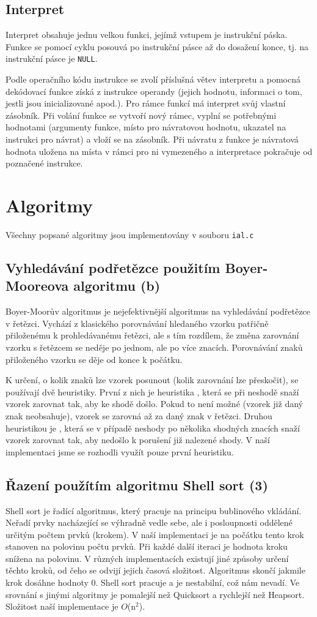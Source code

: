 \documentclass[a4paper, 11pt]{article}
\begin{document}
    \subsection{Interpret}
    Interpret obsahuje jednu velkou funkci, jejímž vstupem je instrukční páska. Funkce se pomocí cyklu posouvá po instrukční pásce až do dosažení konce, tj. na instrukční pásce je \texttt{NULL}.\par
    Podle operačního kódu instrukce se zvolí příslušná větev interpretu a pomocná dekódovací funkce získá z instrukce operandy (jejich hodnotu, informaci o tom, jestli jsou inicializované apod.). Pro rámce funkcí má interpret svůj vlastní zásobník. Při volání funkce se vytvoří nový rámec, vyplní se potřebnými hodnotami (argumenty funkce, místo pro návratovou hodnotu, ukazatel na instrukci pro návrat) a vloží se na zásobník. Při návratu z funkce je návratová hodnota uložena na místa v rámci pro ni vymezeného a interpretace pokračuje od poznačené instrukce.
    \section{Algoritmy}
    Všechny popsané algoritmy jsou implementovány v souboru \texttt{ial.c}
    \subsection{Vyhledávání podřetězce použitím Boyer-Mooreova algoritmu (b)}
	Boyer-Moorův algoritmus je nejefektivnější algoritmus na vyhledávání podřetězce v řetězci. Vychází z klasického porovnávání hledaného vzorku patřičně přiloženému k prohledávanému řetězci, ale s tím rozdílem, že změna zarovnání vzorku s řetězcem se neděje po jednom, ale po více znacích. Porovnávání znaků přiloženého vzorku se děje od konce k počátku.\par
	K určení, o kolik znaků lze vzorek posunout (kolik zarovnání lze přeskočit), se používají dvě heuristiky. První z nich je heuristika , která se při neshodě snaží vzorek zarovnat tak, aby ke shodě došlo. Pokud to není možné (vzorek již daný znak neobsahuje), vzorek se zarovná až za daný znak v řetězci. Druhou heuristikou je , která se v případě neshody po několika shodných znacích snaží vzorek zarovnat tak, aby nedošlo k porušení již nalezené shody. V naší implementaci jsme se rozhodli využít pouze první heuristiku.
    \subsection{Řazení použítím algoritmu Shell sort (3)}
    Shell sort je řadící algoritmus, který pracuje na principu bublinového vkládání. Neřadí prvky nacházející se výhradně vedle sebe, ale i posloupnosti oddělené určitým počtem prvků (krokem). V naší implementaci je na počátku tento krok stanoven na polovinu počtu prvků. Při každé další iteraci je hodnota kroku snížena na polovinu. V různých implementacích existují jiné způsoby určení těchto kroků, od čeho se odvijí jejich časová složitost. Algoritmus skončí jakmile krok dosáhne hodnoty 0. Shell sort pracuje  a je nestabilní, což nám nevadí. Ve srovnání s jinými algoritmy je pomalejší než Quicksort a rychlejší než Heapsort. Složitost naší implementace je $O$(n$^2$).
\end{document}
